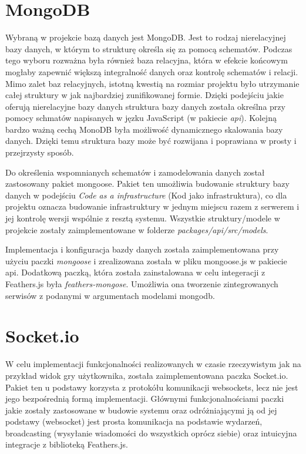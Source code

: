 \section{MongoDB}
Wybraną w projekcie bazą danych jest MongoDB. Jest to rodzaj nierelacyjnej bazy danych, w którym to strukturę określa się za pomocą schematów. Podczas tego wyboru rozważna była również baza relacyjna, która w efekcie końcowym mogłaby zapewnić większą integralność danych oraz kontrolę schematów i relacji. Mimo zalet baz relacyjnych, istotną kwestią na rozmiar projektu było utrzymanie całej struktury w jak najbardziej zunifikowanej formie. Dzięki podejściu jakie oferują nierelacyjne bazy danych struktura bazy danych została określna przy pomocy schmatów napisanych w jęzku JavaScript (w pakiecie \textit{api}). Kolejną bardzo ważną cechą MonoDB była możliwość dynamicznego skalowania bazy danych. Dzięki temu struktura bazy może być rozwijana i poprawiana w prosty i przejrzysty sposób.

Do określenia wspomnianych schematów i zamodelowania danych został zastosowany pakiet mongoose. Pakiet ten umożliwia budowanie struktury bazy danych w podejściu \textit{Code as a infrastructure} (Kod jako infrastruktura), co dla projektu oznacza budowanie infrastruktury w jednym miejscu razem z serwerem i jej kontrolę wersji wspólnie z resztą systemu. Wszystkie struktury/modele w projekcie zostały zaimplementowane w folderze \textit{packages/api/src/models}.

Implementacja i konfiguracja bazdy danych została zaimplementowana przy użyciu paczki \textit{mongoose} i zrealizowana została w pliku mongoose.js w pakiecie api. Dodatkową paczką, która została zainstalowana w celu integeracji z Feathers.js była \textit{feathers-mongose}. Umożliwia ona tworzenie zintegrowanych serwisów z podanymi w argumentach modelami mongodb.

\section{Socket.io}
W celu implementacji funkcjonalności realizowanych w czasie rzeczywistym jak na przykład widok gry użytkownika, została zaimplementowana paczka Socket.io. Pakiet ten u podstawy korzysta z protokółu komunikacji websockets, lecz nie jest jego bezpośrednią formą implementacji. Głównymi funkcjonalnościami paczki jakie zostały zastosowane w budowie systemu oraz odróżniającymi ją od jej podstawy (websocket) jest prosta komunikacja na podstawie wydarzeń, broadcasting (wysyłanie wiadomości do wszystkich oprócz siebie) oraz intuicyjna integracje z biblioteką Feathers.js.

